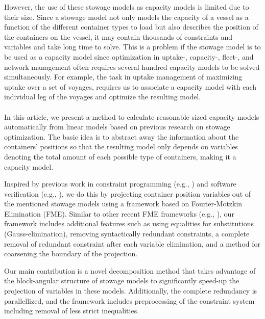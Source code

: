However, the use of these stowage models as capacity models is limited due to their size. Since a stowage model not only models the capacity of a vessel as a function of the different container types to load but also describes the position of the containers on the vessel, it may contain thousands of constraints and variables and take long time to solve. This is a problem if the stowage model is to be used as a capacity model %
since optimization in uptake-, capacity-, fleet-, and network management often requires several hundred capacity models to be solved simultaneously. For example, the task in uptake management of maximizing uptake over a set of voyages, requires us to associate a capacity model with each individual leg of the voyages and optimize the resulting model.  
\\\\
In this article, we present a method to calculate reasonable sized capacity models automatically from linear models based on previous research on stowage optimization. The basic idea is to abstract away the information about the containers' positions so that the resulting model only depends on variables denoting the total amount of each possible type of containers, making it a capacity model. %

Inspired by previous work in constraint programming (e.g., \cite{lassez90}) and software verification (e.g., \cite{benoy05}), we do this by projecting container position variables out of the mentioned stowage models using a framework based on Fourier-Motzkin Elimination (FME). 
Similar to other recent FME frameworks (e.g., \cite{simon05,lukatskii08,shapot12}), our framework includes additional features such as using equalities for substitutions (Gauss-elimination), removing syntactically redundant constraints, a complete removal of redundant constraint after each variable elimination, and a method for coarsening the boundary of the projection. 

Our main contribution is a novel decomposition method that takes advantage of the block-angular structure of stowage models to significantly speed-up the projection of variables in these models. Additionally, the complete redundancy is parallellized, %
and the framework includes preprocessing of the constraint system including removal of less strict inequalities.

